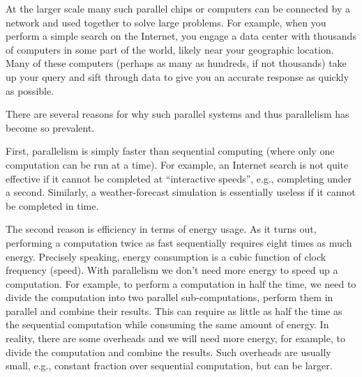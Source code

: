 At the larger scale many such parallel chips or computers can be
connected by a network and used together to solve large problems.  For
example, when you perform a simple search on the Internet, you engage
a data center with thousands of computers in some part of the world,
likely near your geographic location.
%
Many of these computers (perhaps as many as hundreds, if not
thousands) take up your query and sift through data to give you an
accurate response as quickly as possible.






There are several reasons for why such parallel systems and thus
parallelism has become so prevalent.
%


First, parallelism is simply faster than sequential computing (where
only one computation can be run at a time).
%
For example, an Internet search is not quite effective if it cannot be
completed at ``interactive speeds'', e.g., completing under a second.
%
Similarly, a weather-forecast simulation is essentially useless if it
cannot be completed in time.

The second reason is efficiency in terms of energy usage.
%
As it turns out, performing a computation twice as fast sequentially
requires eight times as much energy.  
%
Precisely speaking, energy
consumption is a cubic function of clock frequency (speed).  With
parallelism we don't need more energy to speed up a computation. 
%
For example, to perform a computation in half the time, we need to
divide the computation into two parallel sub-computations, perform
them in parallel and combine their results.  This can require as
little as half the time as the sequential computation while consuming
the same amount of energy.
%
In reality, there are some overheads and we will need more energy, for
example, to divide the computation and combine the results.
Such overheads are usually small, e.g., constant fraction over
sequential computation, but can be larger. 

